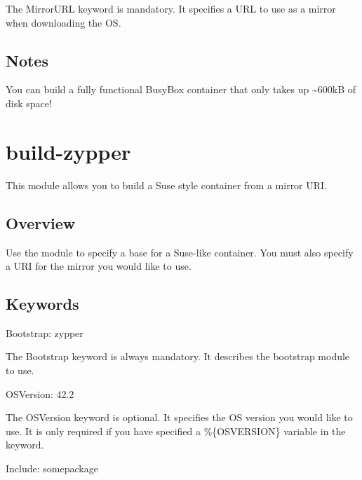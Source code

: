 \documentclass[letterpaper,10pt,english]{sphinxmanual}
\begin{document}
The MirrorURL keyword is mandatory. It specifies a URL to use as a mirror when downloading the OS.


\subsection{Notes}
\label{\detokenize{appendix:id25}}
You can build a fully functional BusyBox container that only takes up \textasciitilde{}600kB of disk space!


\section{build-zypper}
\label{\detokenize{appendix:build-zypper}}\label{\detokenize{appendix:id26}}\label{\detokenize{appendix:sec-build-zypper}}
This module allows you to build a Suse style container from a mirror URI.


\subsection{Overview}
\label{\detokenize{appendix:id27}}
Use the  module to specify a base for a Suse-like container. You must also specify a URI for
the mirror you would like to use.


\subsection{Keywords}
\label{\detokenize{appendix:id28}}
%
\begin{sphinxVerbatim}[commandchars=\\\{\}]
Bootstrap: zypper
\end{sphinxVerbatim}

The Bootstrap keyword is always mandatory. It describes the bootstrap module to use.

%
\begin{sphinxVerbatim}[commandchars=\\\{\}]
OSVersion: 42.2
\end{sphinxVerbatim}

The OSVersion keyword is optional. It specifies the OS version you would like to use.
It is only required if you have specified a \%\{OSVERSION\} variable in the  keyword.

%
\begin{sphinxVerbatim}[commandchars=\\\{\}]
Include: somepackage
\end{sphinxVerbatim}
\end{document}
